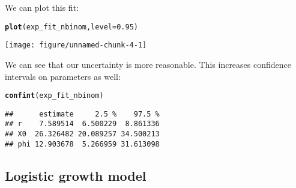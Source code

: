 \documentclass{article}\usepackage[]{graphicx}\usepackage[]{color}
\makeatletter
\def\maxwidth{ %
  \ifdim\Gin@nat@width>\linewidth
    \linewidth
  \else
    \Gin@nat@width
  \fi
}
\newcommand{\hlnum}[1]{\textcolor[rgb]{0.686,0.059,0.569}{#1}}%
\newcommand{\hlstd}[1]{\textcolor[rgb]{0.345,0.345,0.345}{#1}}%
\newcommand{\hlkwc}[1]{\textcolor[rgb]{0.333,0.667,0.333}{#1}}%
\newcommand{\hlkwd}[1]{\textcolor[rgb]{0.737,0.353,0.396}{\textbf{#1}}}%
\newenvironment{kframe}{%
 \def\at@end@of@kframe{}%
 \ifinner\ifhmode%
  \def\at@end@of@kframe{\end{minipage}}%
  \begin{minipage}{\columnwidth}%
 \fi\fi%
 \def\FrameCommand##1{\hskip\@totalleftmargin \hskip-\fboxsep
 \colorbox{shadecolor}{##1}\hskip-\fboxsep
     \hskip-\linewidth \hskip-\@totalleftmargin \hskip\columnwidth}%
 \MakeFramed {\advance\hsize-\width
   \@totalleftmargin\z@ \linewidth\hsize
   \@setminipage}}%
 {\par\unskip\endMakeFramed%
 \at@end@of@kframe}
\newenvironment{knitrout}{}{} %
\makeatother
\begin{document}
We can plot this fit:
\begin{knitrout}
\color{fgcolor}\begin{kframe}
\begin{alltt}
\hlkwd{plot}\hlstd{(exp_fit_nbinom,} \hlkwc{level}\hlstd{=}\hlnum{0.95}\hlstd{)}
\end{alltt}
\end{kframe}
\texttt{[image: figure/unnamed-chunk-4-1]} 

\end{knitrout}
We can see that our uncertainty is more reasonable. This
increases confidence intervals on parameters as well:
\begin{knitrout}
\color{fgcolor}\begin{kframe}
\begin{alltt}
\hlkwd{confint}\hlstd{(exp_fit_nbinom)}
\end{alltt}
\begin{verbatim}
##      estimate     2.5 %    97.5 %
## r    7.589514  6.500229  8.861336
## X0  26.326482 20.089257 34.500213
## phi 12.903678  5.266959 31.613098
\end{verbatim}
\end{kframe}
\end{knitrout}

\subsection{Logistic growth model}
\end{document}
